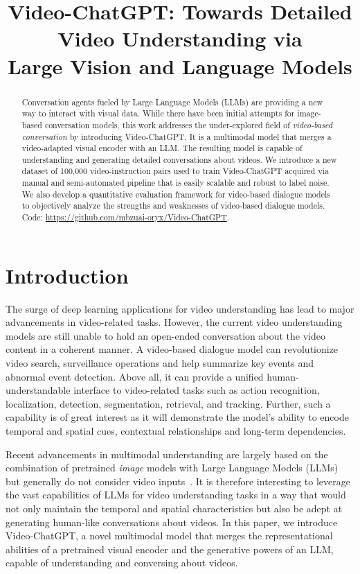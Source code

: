 \title{Video-ChatGPT: Towards Detailed Video Understanding via \\
Large Vision and Language Models}



\maketitle
\begin{abstract}
Conversation agents fueled by Large Language Models (LLMs) are providing a new way to interact with visual data. While there have been initial attempts for image-based conversation models, this work addresses the under-explored field of \emph{video-based conversation} by introducing Video-ChatGPT. It is a multimodal model that merges a video-adapted visual encoder with an LLM. The resulting model is capable of understanding and generating detailed conversations about videos. We introduce a new dataset of 100,000 video-instruction pairs used to train Video-ChatGPT acquired via manual and semi-automated pipeline that is easily scalable and robust to label noise. We also develop a quantitative evaluation framework for video-based dialogue models to objectively analyze the strengths and weaknesses of video-based dialogue models. Code: \url{https://github.com/mbzuai-oryx/Video-ChatGPT}.
\end{abstract}

\section{Introduction}
The surge of deep learning applications for video understanding has lead to major advancements in video-related tasks. However, the current video understanding models are still unable to hold an open-ended conversation about the video content in a coherent manner. A video-based dialogue model can revolutionize video search, surveillance operations and help summarize key events and abnormal event detection. Above all, it can provide a unified human-understandable interface to video-related tasks such as action recognition, localization, detection, segmentation, retrieval, and tracking. Further, such a capability is of great interest as it will demonstrate the model's ability to encode temporal and spatial cues, contextual relationships and long-term dependencies. 

Recent advancements in multimodal understanding are largely based on the combination of pretrained \emph{image} models with Large Language Models (LLMs) but generally do not consider video inputs~\cite{liu2023llava, zhu2023minigpt, blip, blip-2, instructblip}. It is therefore interesting to leverage the vast capabilities of LLMs for video understanding tasks in a way that would not only maintain the temporal and spatial characteristics but also be adept at generating human-like conversations about videos. In this paper, we introduce Video-ChatGPT, a novel multimodal model that merges the representational abilities of a pretrained visual encoder and the generative powers of an LLM, capable of understanding and conversing about videos. 

